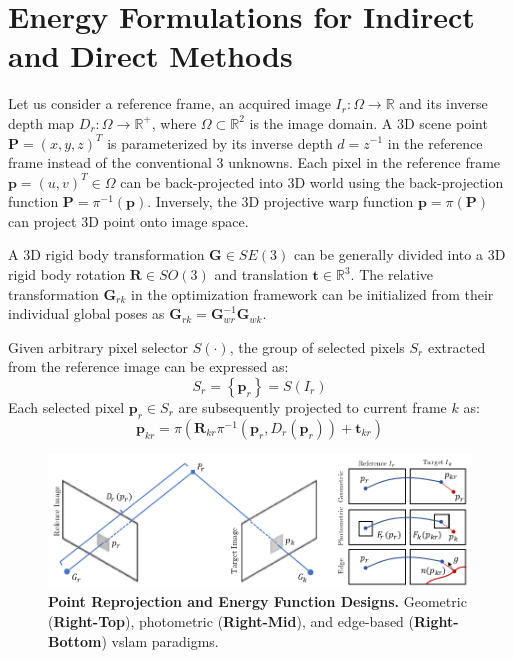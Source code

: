 \section{Energy Formulations for Indirect and Direct Methods} 
\label{sec:preliminaries_energy}
Let us consider a reference frame, an acquired image $I_{r}: \Omega \rightarrow \mathbb{R}$ and its inverse depth map  $D_{r}: \Omega \rightarrow \mathbb{R}^{+}$, where $\Omega \subset \mathbb{R}^2$ is the image domain. 
A 3D scene point $\mathbf{P} = (x, y, z)^{T}$ is parameterized by its inverse depth $d = z^{-1}$ in the reference frame instead of the conventional 3 unknowns. Each pixel in the reference frame $\mathbf{p} = (u,v)^T \in \Omega$ can be back-projected into 3D world using the back-projection function $\mathbf{P} = \pi^{-1}(\mathbf{p})$. 
Inversely, the 3D projective warp function $\mathbf{p} = \pi(\mathbf{P})$ can project 3D point onto image space. 

A 3D rigid body transformation $\mathbf{G} \in SE(3)$ can be generally divided into a 3D rigid body rotation $\mathbf{R} \in SO(3)$ and translation $\mathbf{t} \in \mathbb{R}^3$. 
The relative transformation $\mathbf{G}_{rk}$ in the optimization framework can be initialized from their individual global poses as $\mathbf{G}_{rk} = \mathbf{G}_{wr}^{-1}\mathbf{G}_{wk}$.  

Given arbitrary pixel selector $\mathit{S}(\cdot)$, the group of selected pixels $\mathit{S}_r$ extracted from the reference image can be expressed as:
\begin{equation} \label{eq:preliminaries_selector}
\mathit{S}_r =  \left \{ \mathbf{p}_r \right \} = \mathit{S}(I_r) 
\end{equation} 
Each selected pixel $ \mathbf{p}_r \in \mathit{S}_{r}$ are subsequently projected to current frame $k$ as:
\begin{equation} \label{eq:preliminaries_pointproj}
 \mathbf{p}_{kr} =  \pi ( \mathbf{R}_{kr}\pi^{-1}(\mathbf{p}_r,D_{r}(\mathbf{p}_r) )+\mathbf{t}_{kr} ) 
\end{equation} 

\begin{figure}[t]
    \centering
	\includegraphics[width=1.0\textwidth]{figures/prelim/reprojection.pdf}
	\caption[Point Reprojection and Energy Function Designs]{\textbf{Point Reprojection and Energy Function Designs.} Geometric (\textbf{Right-Top}), photometric (\textbf{Right-Mid}), and edge-based (\textbf{Right-Bottom}) \acrshort{vslam} paradigms.
	\label{fig:preliminaries_energy}}
\end{figure} 
 

